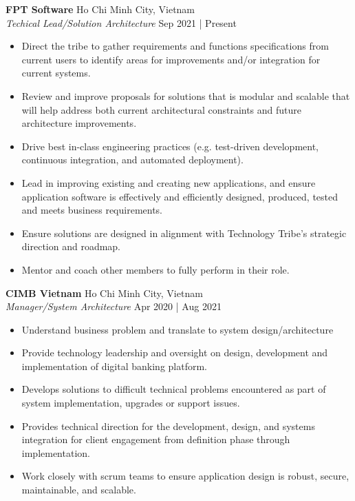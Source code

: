 \documentclass[a4paper]{article}
\begin{document}
\textbf{FPT Software} \hfill Ho Chi Minh City, Vietnam\\
\textit{Techical Lead/Solution Architecture} \hfill Sep 2021 | Present\\
\vspace{-1mm}
\begin{itemize} \itemsep 1pt
	\item Direct the tribe to gather requirements and functions specifications from current users to identify areas for improvements and/or integration for current systems.
	\item Review and improve proposals for solutions that is modular and scalable that will help address both current architectural constraints and future architecture improvements.
	\item Drive best in-class engineering practices (e.g. test-driven development, continuous integration, and automated deployment).
	\item Lead in improving existing and creating new applications, and ensure application software is effectively and efficiently designed, produced, tested and meets business requirements.
	\item Ensure solutions are designed in alignment with Technology Tribe’s strategic direction and roadmap.
	\item Mentor and coach other members to fully perform in their role.
\end{itemize}

\textbf{CIMB Vietnam} \hfill Ho Chi Minh City, Vietnam\\
\textit{Manager/System Architecture} \hfill Apr 2020 | Aug 2021\\
\vspace{-1mm}
\begin{itemize} \itemsep 1pt
	\item Understand business problem and translate to system design/architecture
	\item Provide technology leadership and oversight on design, development and implementation of digital banking platform.
	\item Develops solutions to difficult technical problems encountered as part of system implementation, upgrades or support issues.
	\item Provides technical direction for the development, design, and systems integration for client engagement from definition phase through implementation.
	\item Work closely with scrum teams to ensure application design is robust, secure, maintainable, and scalable.
\end{itemize}
\end{document}
